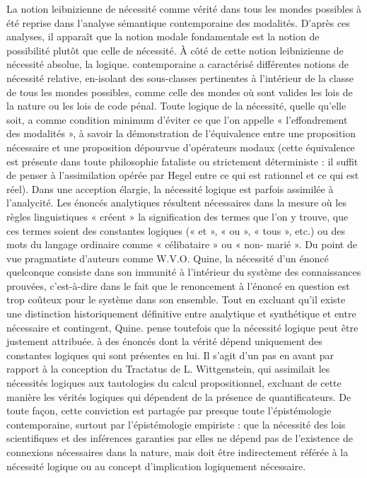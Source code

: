 La notion leibnizienne de nécessité
comme vérité dans tous les mondes possibles à été reprise dans l’analyse sémantique contemporaine des modalités.
D'après ces analyses, il apparaît que la
notion modale fondamentale est la notion
de possibilité plutôt que celle de nécessité. À côté de cette notion leibnizienne
de nécessité absolue, la logique. contemporaine a caractérisé différentes notions
de nécessité relative, en-isolant des sous-classes pertinentes à l’intérieur de la
classe de tous les mondes possibles,
comme celle des mondes où sont valides
les lois de la nature ou les lois de code
pénal. Toute logique de la nécessité,
quelle qu’elle soit, a comme condition
minimum d'éviter ce que l’on appelle
« l’effondrement des modalités », à savoir
la démonstration de l’équivalence entre
une proposition nécessaire et une proposition dépourvue d’opérateurs modaux
(cette équivalence est présente dans toute
philosophie fataliste ou strictement déterministe : il suffit de penser à l’assimilation
opérée par Hegel entre ce qui est rationnel et ce qui est réel). Dans une acception
élargie, la nécessité logique est parfois
assimilée à l’analycité. Les énoncés analytiques résultent nécessaires dans la
mesure où les règles linguistiques
« créent » la signification des termes que
l’on y trouve, que ces termes soient des
constantes logiques (« et », « ou »,
« tous », etc.) ou des mots du langage
ordinaire comme « célibataire » ou « non-
marié ». Du point de vue pragmatiste
d'auteurs comme W.V.O. Quine, la nécessité d’un énoncé quelconque consiste dans
son immunité à l’intérieur du système des
connaissances prouvées, c’est-à-dire dans
le fait que le renoncement à l’énoncé en
question est trop coûteux pour le système
dans son ensemble. Tout en excluant qu’il
existe une distinction historiquement définitive entre analytique et synthétique et
entre nécessaire et contingent, Quine.
pense toutefois que la nécessité logique
peut être justement attribuée. à des
énoncés dont la vérité dépend uniquement des constantes logiques qui sont
présentes en lui. Il s’agit d’un pas en avant
par rapport à la conception du Tractatus
de L. Wittgenstein, qui assimilait les
nécessités logiques aux tautologies du calcul propositionnel, excluant de cette
manière les vérités logiques qui dépendent de la présence de quantificateurs. De
toute façon, cette conviction est partagée
par presque toute  l'épistémologie
contemporaine, surtout par l’épistémologie empiriste : que la nécessité des lois
scientifiques et des inférences garanties
par elles ne dépend pas de l’existence de
connexions nécessaires dans la nature,
mais doit être indirectement référée à la
nécessité logique ou au concept d’implication logiquement nécessaire.


